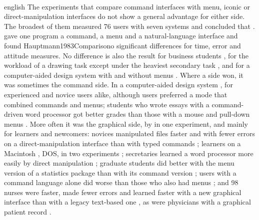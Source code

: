 \paragraph{} %
\begin{onlyin}{english} %
The experiments that compare command interfaces with menu, iconic or
direct-manipulation interfaces do not show a general advantage for
either side.  The broadest of them measured 76 users with seven systems
and concluded that .
\Textcite{Hauptmann1983Comparison} gave one program a command, a menu
and a natural-language interface and found \textcquote
{Hauptmann1983Comparison}{o significant differences
\textelp{} for time, error and attitude measures}.  No difference is
also the result for business students \autocite{Lindner1998Command},
for the workload of a drawing task except under the heaviest secondary task
\autocite{Eberleh1992Thinking}, and for a computer-aided design system
with and without menus \autocite{Roy1992Evaluation}.  Where a side won,
it was sometimes the command side.  In a computer-aided design system
, for experienced and novice
users alike, although users preferred a mode that combined commands and
menus; students who wrote essays with a command-driven word processor
got better grades than those with a mouse and pull-down menus
\autocite{Mahach1995Effects}.  More often it was the graphical side, by
 in
one experiment, and mainly for learners and newcomers: novices
manipulated files faster and with fewer errors on a direct-manipulation
interface than with typed commands \autocite{Margono1995Study};
learners on a Macintosh ,
DOS, in two experiments \autocite{Davis1992Experimental}; secretaries
learned a word processor more easily by direct manipulation
\autocite{Jordan1992Claims}; graduate students did better with the
menu version of a statistics package than with its command version
\autocite{Schultz1998Effects}; users with a command language alone did
worse than those who also had menus \autocite{Taylor1987Experimental};
and 98 nurses were faster, made fewer errors and learned faster with a
new graphical interface than with a legacy text-based one
\autocite{Staggers2000Comparing}, as were physicians with a graphical
patient record \autocite{Rodriguez2002Study}.


\end{onlyin}
